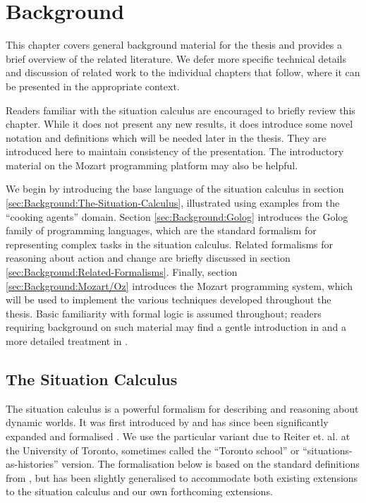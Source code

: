 

\chapter{Background}

\label{ch:background}

This chapter covers general background material for the thesis and
provides a brief overview of the related literature. We defer more
specific technical details and discussion of related work to the individual
chapters that follow, where it can be presented in the appropriate
context.

Readers familiar with the situation calculus are encouraged to briefly
review this chapter. While it does not present any new results, it
does introduce some novel notation and definitions which will be needed
later in the thesis. They are introduced here to maintain consistency
of the presentation. The introductory material on the Mozart programming
platform may also be helpful.

We begin by introducing the base language of the situation calculus
in section \ref{sec:Background:The-Situation-Calculus}, illustrated
using examples from the {}``cooking agents'' domain. Section \ref{sec:Background:Golog}
introduces the Golog family of programming languages, which are the
standard formalism for representing complex tasks in the situation
calculus. Related formalisms for reasoning about action and change
are briefly discussed in section \ref{sec:Background:Related-Formalisms}.
Finally, section \ref{sec:Background:Mozart/Oz} introduces the Mozart
programming system, which will be used to implement the various techniques
developed throughout the thesis. Basic familiarity with formal logic
is assumed throughout; readers requiring background on such material
may find a gentle introduction in \citep{kelly96logic} and a more
detailed treatment in \citep{fitting96fol_book}.


\section{The Situation Calculus\label{sec:Background:The-Situation-Calculus}}

The situation calculus is a powerful formalism for describing and
reasoning about dynamic worlds. It was first introduced by \citet{McCHay69sitcalc}
and has since been significantly expanded and formalised \citep{reiter91frameprob,pirri99contributions_sitcalc}.
We use the particular variant due to Reiter et. al. at the University
of Toronto, sometimes called the {}``Toronto school'' or {}``situations-as-histories''
version. The formalisation below is based on the standard definitions
from \citep{levesque98sc_foundations,pirri99contributions_sitcalc,reiter01kia},
but has been slightly generalised to accommodate both existing extensions
to the situation calculus and our own forthcoming extensions.

